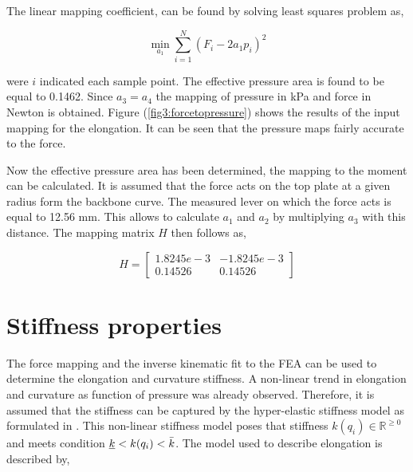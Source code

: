 The linear mapping coefficient, can be found by solving least squares problem as,



\begin{equation}
\min_{a_1} \sum_{i=1}^{N} (F_i - 2 a_1 p_i)^2
\label{eq3:forcefitting}
\end{equation}

were $i$ indicated each sample point. The effective pressure area is found to be equal to 0.1462. Since $a_3 = a_4$ the mapping of pressure in kPa and force in Newton is obtained. Figure (\ref{fig3:forcetopressure}) shows the results of the input mapping for the elongation. It can be seen that the pressure maps fairly accurate to the force.

Now the effective pressure area has been determined, the mapping to the moment can be calculated. It is assumed that the force acts on the top plate at a given radius form the backbone curve. The measured lever on which the force acts is equal to 12.56 mm. This allows to calculate $a_1$ and $a_2$ by multiplying $a_3$ with this distance. The mapping matrix $H$ then follows as,

\begin{equation}
    H =  \begin{bmatrix} 1.8245e-3 & -1.8245e-3 \\
    0.14526 & 0.14526\end{bmatrix}  
\end{equation}








\section{Stiffness properties}

The force mapping and the inverse kinematic fit to the FEA can be used to determine the elongation and curvature stiffness. A non-linear trend in elongation and curvature as function of pressure was already observed. Therefore, it is assumed that the stiffness can be captured by the hyper-elastic stiffness model as formulated in \cite{Caasenbrood2020StiffnessModel}. This non-linear stiffness model poses that stiffness $k(q_i) \in \mathbb{R}^{\geq 0}$ and meets condition $\underbar{$k$} < k(q_i) < \Bar{k}$. The model used to describe elongation is described by,

